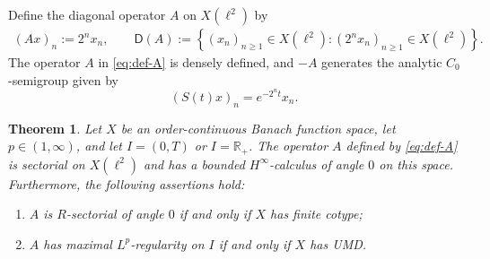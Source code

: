 \documentclass{amsart}
\let\geq\geqslant
\theoremstyle{plain}
\newtheorem{theorem}{Theorem}[section]
\theoremstyle{remark}
\theoremstyle{plain}
\numberwithin{equation}{section}
\newcommand{\R}{\mathbb R}
\newcommand{\1}{\mathbf 1}
\newcommand{\Dom}{\mathsf{D}}
\begin{document}
Define the diagonal operator $A$ on $X(\ell^2)$ by
\begin{align}\label{eq:def-A}
        (Ax)_n:=2^nx_n,
        \qquad
        \Dom(A):=
        \left\{
        (x_n)_{n\geq1}\in X(\ell^2):
        (2^nx_n)_{n\geq1}\in X(\ell^2)
        \right\}.
\end{align}
The operator $A$ in
\eqref{eq:def-A} is densely defined, and $-A$ generates the analytic
$C_0$-semigroup given by
\[
        (S(t)x)_n=e^{-2^nt}x_n.
\]

\begin{theorem}\label{thm:Xexample}
Let $X$ be an order-continuous Banach function space, let $p\in(1,\infty)$, and let $I= (0,T)$ or $I = \R_+$. The operator $A$ defined by \eqref{eq:def-A} is sectorial on $X(\ell^2)$ and has a bounded $H^\infty$-calculus of angle $0$ on this space. Furthermore, the following assertions hold:
\begin{enumerate}[label={\rm(\arabic*)}, leftmargin=*]
  \item\label{it:1Xexample} $A$ is $R$-sectorial of angle $0$ if and only if $X$ has finite cotype;
  \item\label{it:2Xexample} $A$ has maximal $L^p$-regularity on $I$ if and only if $X$ has UMD.
\end{enumerate}
\end{theorem}
\end{document}
